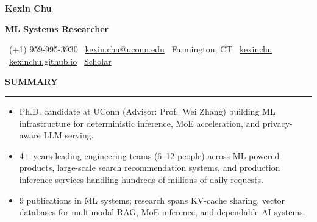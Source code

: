 \documentclass[]{resume}
\renewenvironment{rSection}[1]{%
  \vspace{0.3em}%
  \MakeUppercase{\textbf{#1}}%
  \vspace{0.16em}%
  \hrule
  \vspace{0.22em}%
  \begin{list}{}{%
    \setlength{\leftmargin}{0.85em}%
    \setlength{\rightmargin}{0em}%
    \setlength{\itemsep}{0pt}%
    \setlength{\topsep}{0pt}%
    \setlength{\parsep}{0pt}%
    \setlength{\partopsep}{0pt}%
  }%
  \item[]%
}{%
  \end{list}%
  \vspace{-0.28em}%
}
\newcommand{\MakeHeader}[8]{%
\noindent
{\centering \bfseries \Large #1 \par}
\vspace{2pt}

\noindent
\colorbox{HeaderOrange}{%
  \parbox{\textwidth}{%
    \vspace{2pt}
    \centering
    {\color{white}\bfseries\small #2}
    \vspace{2pt}
  }%
}\par

\noindent
\colorbox{HeaderLight}{%
  \parbox{\textwidth}{%
    \vspace{2pt}
    \scriptsize
    \faPhone\ #3 \hfill
    \faEnvelope\ \href{mailto:#4}{#4} \hfill
    \faMapMarker*\ #5 \hfill
    \faLinkedin\ \href{#6}{kexinchu} \hfill
    \faGlobe\ \href{#7}{kexinchu.github.io} \hfill
    \faGraduationCap\ \href{#8}{Scholar}
    \vspace{2pt}
  }%
}\par
}
\begin{document}
\MakeHeader
{Kexin Chu}
{ML Systems Researcher}
{(+1) 959-995-3930}
{kexin.chu@uconn.edu}
{Farmington, CT}
{https://www.linkedin.com/in/kexin-chu-69a481192}
{https://kexinchu.github.io/}
{https://scholar.google.com/citations?user=ZIdS3d0AAAAJ}

\fontsize{10.35pt}{11.15pt}\selectfont

\begin{rSection}{Summary}
\begin{itemize}
    \item Ph.D. candidate at UConn (Advisor: Prof.\ Wei Zhang) building ML infrastructure for deterministic inference, MoE acceleration, and privacy-aware LLM serving.
    \item 4+ years leading engineering teams (6--12 people) across ML-powered products, large-scale search recommendation systems, and production inference services handling hundreds of millions of daily requests.
    \item 9 publications in ML systems; research spans KV-cache sharing, vector databases for multimodal RAG, MoE inference, and dependable AI systems.
\end{itemize}
\end{rSection}
\end{document}
